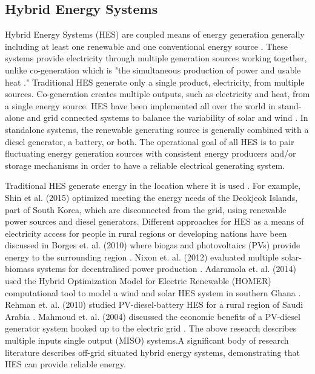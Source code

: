 \documentclass{article}                                                                           %
\begin{document}
\begin{linenumbers}
\subsection{Hybrid Energy Systems}
Hybrid Energy Systems (HES) are coupled means of energy generation generally including at least one renewable and one conventional energy source \cite {Ibrahim2011}. These systems provide electricity through multiple generation sources working together, unlike co-generation which is "the simultaneous production of power and usable heat \cite{Rosen2005}." Traditional HES generate only a single product, electricity, from multiple sources. Co-generation creates multiple outputs, such as electricity and heat, from a single energy source. HES have been implemented all over the world in stand-alone and grid connected systems to balance the variability of solar and wind \cite {Garcia2015, Qi2014, Shin2015, Nixon2012, Adaramola2014, Goodbody2013, BorgesNeto2010, McGowan1996}. In standalone systems, the renewable generating source is generally combined with a diesel generator, a battery, or both. The operational goal of all HES is to pair fluctuating energy generation sources with consistent energy producers and/or storage mechanisms in order to have a reliable electrical generating system.

Traditional HES generate energy in the location where it is used \cite {Shin2015, Nixon2012, Adaramola2014, Goodbody2013, McGowan1996}. For example, Shin et al. (2015) optimized meeting the energy needs of the Deokjeok Islands, part of South Korea, which are disconnected from the grid, using renewable power sources and diesel generators. Different approaches for HES as a means of electricity access for people in rural regions or developing nations have been discussed in Borges et. al. (2010) where biogas and photovoltaics (PVs) provide energy to the surrounding region \cite{BorgesNeto2010}. Nixon et. al. (2012) evaluated multiple solar-biomass systems for decentralised power production \cite{Nixon2012}. Adaramola et. al. (2014) used the Hybrid Optimization Model for Electric Renewable (HOMER) computational tool to model a wind and solar HES system in southern Ghana \cite{Adaramola2014}. Rehman et. al. (2010) studied PV-diesel-battery HES for a rural region of Saudi Arabia \cite{Rehman2010}. Mahmoud et. al. (2004) discussed the economic benefits of a PV-diesel generator system hooked up to the electric grid \cite {Mahmoud2004}. The above research describes multiple inputs single output (MISO) systems\cite{Garcia2013}.A significant body of research literature describes off-grid situated hybrid energy systems, demonstrating that HES can provide reliable energy.



\end{linenumbers}
\end{document}
